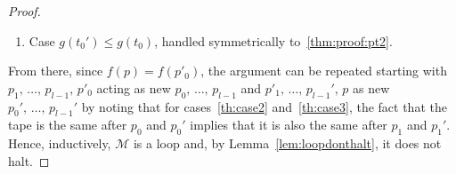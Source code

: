 \begin{proof}
\begin{enumerate}
              Let's assume there is no such time step, which implies that $f(p) = f(\overline{p_0'})$ with $\overline{p_0'} = (t_0',g(t))$, dashed red in Figure~\ref{fig:loop-proof}~(right). It also implies that there is no time step between $t_0$ and $t_0+l-1$ such that tape position $g(t_0')$ has been visited, otherwise, our hypothesis would be contradicted by translating by $p_0'-p_0$. Hence, we also get $f(p'_0) = f(\overline{p_0})$ with $\overline{p_0} = (t_0,g(t_0'))$. By hypothesis, tape content to the right of $p_0$ is the same as to the right of $p_0'$, and $p-p_0' = p'_0 - p_0$ implies that $g(t)-g(t_0') = g(t_0') - g(t_0)$, hence $f(\overline{p_0}) = f(\overline{p_0'})$ and, finally, $f(p) = f(p'_0)$.\label{thm:proof:pt2}
        \item Case $g(t_0') \leq g(t_0)$, handled symmetrically to~\ref{thm:proof:pt2}.
    \end{enumerate}
    From there, since $f(p) = f(p'_0)$, the argument can be repeated starting with $p_1,\, \dots,\, p_{l-1},\, p'_0$ acting as new $p_0,\,\dots,\,p_{l-1}$ and $p'_1,\, \dots,\, p_{l-1}',\, p$ as new $p_0',\,\dots,\,p_{l-1}'$ by noting that for cases~\ref{th:case2} and~\ref{th:case3}, the fact that the tape is the same after $p_0$ and $p_0'$ implies that it is also the same after $p_1$ and $p_1'$. Hence, inductively, $\mathcal{M}$ is a loop and, by Lemma~\ref{lem:loopdonthalt}, it does not halt.
\end{proof}




\newpage


